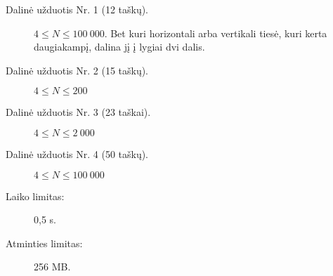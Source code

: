 \documentclass{boi2014-lt}
\begin{document}
    \Scoring

    \begin{description}
        \item[Dalinė užduotis Nr. 1 (12 taškų).] $4 \le N \le 100\ 000$.
            Bet kuri horizontali arba vertikali tiesė, kuri kerta daugiakampį,
            dalina jį į lygiai dvi dalis.
        \item[Dalinė užduotis Nr. 2 (15 taškų).] $4 \le N \le 200$
        \item[Dalinė užduotis Nr. 3 (23 taškai).] $4 \le N \le 2\ 000$
        \item[Dalinė užduotis Nr. 4 (50 taškų).] $4 \le N \le 100\ 000$
    \end{description}

    \Constraints

    \begin{description}
        \item[Laiko limitas:] 0,5 s.
        \item[Atminties limitas:] 256 MB.
    \end{description}
\end{document}
